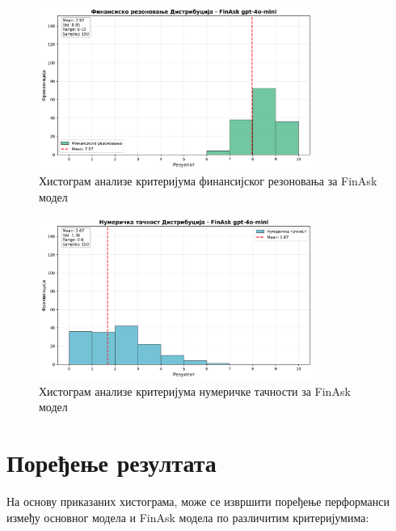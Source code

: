 \begin{figure}[h]
    \centering
    \includegraphics[width=0.8\textwidth]{images/FinAsk/criteria_analysis_financial_reasoning_histogram.png}
    \caption{Хистограм анализе критеријума финансијског резоновања за FinAsk модел}
    \label{fig:finask_financial}
\end{figure}

\begin{figure}[h]
    \centering
    \includegraphics[width=0.8\textwidth]{images/FinAsk/criteria_analysis_numerical_accuracy_histogram.png}
    \caption{Хистограм анализе критеријума нумеричке тачности за FinAsk модел}
    \label{fig:finask_numerical}
\end{figure}

\section{Поређење резултата}

На основу приказаних хистограма, може се извршити поређење перформанси између основног модела и FinAsk модела по различитим критеријумима:

